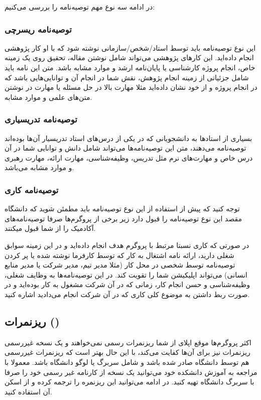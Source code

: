 در ادامه سه نوع مهم توصیه‌نامه را بررسی می‌کنیم:

\subsubsection{توصیه‌نامه ریسرچی}
این نوع توصیه‌نامه باید توسط استاد/شخص/سازمانی نوشته شود که با او کار پژوهشی انجام داده‌اید. این کارهای پژوهشی می‌تواند شامل 
نوشتن مقاله، تحقیق روی یک زمینه خاص، انجام پروژه کارشناسی یا پایان‌نامه ارشد و موارد مشابه باشد. متن این نامه باید شامل جزئیاتی از 
زمینه انجام پژوهش، نقش شما در انجام آن و توانایی‌هایی باشد که در انجام پروژه و از خود نشان داده‌اید مثلا مهارت بالا در حل مسئله
یا مهارت در نوشتن متن‌های علمی و موارد مشابه.

\subsubsection{توصیه‌نامه تدریسیاری}
بسیاری از استاد‌ها به دانشجویانی که در یکی از درس‌های استاد تدریسیار آن‌ها بوده‌اند توصیه‌نامه می‌دهند، متن این توصیه‌نامه‌ها می‌تواند شامل 
دانش و توانایی شما در آن درس خاص و مهارت‌های نرم مثل تدریس، وظیفه‌شناسی، مهارت ارائه، مهارت رهبری و موارد مشابه می‌باشد. 

\subsubsection{توصیه‌نامه کاری}
\begin{warningbox}
توجه کنید که پیش از استفاده از این نوع توصیه‌نامه باید مطمئن شوید که دانشگاه مقصد این نوع توصیه‌نامه را قبول دارد زیر برخی از پروگرم‌ها
صرفا توصیه‌نامه‌های آکادمیک را از شما قبول میکنند. 
\end{warningbox}

در صورتی که کاری نسبتا مرتبط با پروگرم هدف انجام داده‌اید و در این زمینه سوابق شغلی دارید، ارائه نامه اشتغال به کار که توسط کارفرما نوشته شده
یا پر کردن توصیه‌نامه توسط شخصی در محل کار (مثلا مدیر تیم، مدیر شرکت یا مدیر منابع انسانی) می‌تواند اپلیکیشن شما را تقویت کند. 
در این توصیه‌نامه‌ها به وظایف شغلی، وظیفه‌شناسی و حسن انجام کار، زمانی که در آن شرکت مشغول به کار بوده‌اید و در صورت ربط داشتن به 
موضوع کلی کاری که در آن شرکت انجام می‌دادید اشاره کنید. 


\subsection{ریزنمرات ()}\label{ssec:transcripts}
اکثر پروگرم‌ها موقع اپلای از شما ریزنمرات رسمی نمی‌خواهند و یک نسخه غیررسمی ریزنمرات نیز برای آن‌ها کفایت می‌کند، با این حال بهتر است که ریزنمرات
غیررسمی هم توسط دانشگاه صادر شده باشد و شامل سربرگ یا لوگو دانشگاه باشد. معمولا با مراجعه به آموزش دانشکده خود می‌توانید یک نسخه 
از کارنامه غیر رسمی خود را صرفا با سربرگ دانشگاه تهیه کنید. در ادامه می‌توانید این ریزنمره را ترجمه کرده و از اسکن آن استفاده کنید. 


